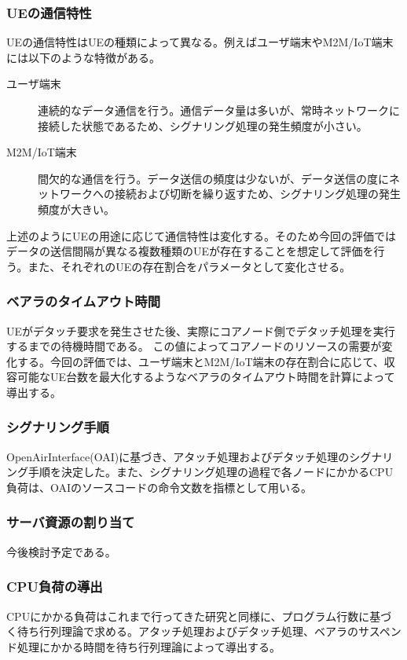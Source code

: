 \documentclass[a4j]{ujarticle}
\begin{document}
\subsubsection{UEの通信特性}
UEの通信特性はUEの種類によって異なる。例えばユーザ端末やM2M/IoT端末には以下のような特徴がある。
\begin{description}
  \item[ユーザ端末] 連続的なデータ通信を行う。通信データ量は多いが、常時ネットワークに接続した状態であるため、シグナリング処理の発生頻度が小さい。
  \item[M2M/IoT端末] 間欠的な通信を行う。データ送信の頻度は少ないが、データ送信の度にネットワークへの接続および切断を繰り返すため、シグナリング処理の発生頻度が大きい。
\end{description}
上述のようにUEの用途に応じて通信特性は変化する。そのため今回の評価ではデータの送信間隔が異なる複数種類のUEが存在することを想定して評価を行う。また、それぞれのUEの存在割合をパラメータとして変化させる。

\subsubsection{ベアラのタイムアウト時間}
UEがデタッチ要求を発生させた後、実際にコアノード側でデタッチ処理を実行するまでの待機時間である。
この値によってコアノードのリソースの需要が変化する。今回の評価では、ユーザ端末とM2M/IoT端末の存在割合に応じて、収容可能なUE台数を最大化するようなベアラのタイムアウト時間を計算によって導出する。


\subsubsection{シグナリング手順}
OpenAirInterface(OAI)\cite{OpenAirInterface}に基づき、アタッチ処理およびデタッチ処理のシグナリング手順を決定した。また、シグナリング処理の過程で各ノードにかかるCPU負荷は、OAIのソースコードの命令文数を指標として用いる。
\subsubsection{サーバ資源の割り当て}
今後検討予定である。

\subsubsection{CPU負荷の導出}
\label{sec:cpu}
CPUにかかる負荷はこれまで行ってきた研究と同様に、プログラム行数に基づく待ち行列理論で求める。アタッチ処理およびデタッチ処理、ベアラのサスペンド処理にかかる時間を待ち行列理論によって導出する。
\end{document}
